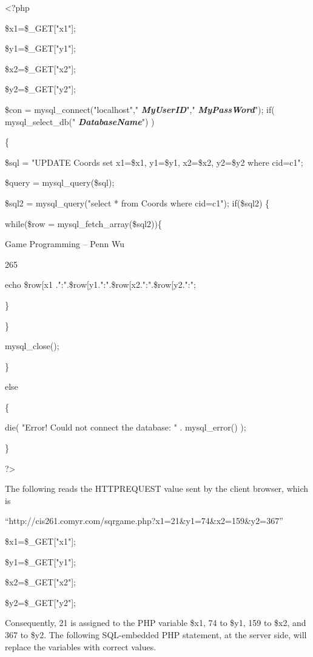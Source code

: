 \documentclass[
]{article}
\begin{document}
\textless?php

\$x1=\$\_GET{[}"x1"{]};

\$y1=\$\_GET{[}"y1"{]};

\$x2=\$\_GET{[}"x2"{]};

\$y2=\$\_GET{[}"y2"{]};

\$con = mysql\_connect("localhost"," \emph{\textbf{MyUserID}}","
\emph{\textbf{MyPassWord}}"); if( mysql\_select\_db("
\emph{\textbf{DatabaseName}}") )

\{

\$sql = "UPDATE Coords set x1=\textquotesingle\$x1\textquotesingle,
y1=\textquotesingle\$y1\textquotesingle,
x2=\textquotesingle\$x2\textquotesingle,
y2=\textquotesingle\$y2\textquotesingle{} where
cid=\textquotesingle c1\textquotesingle";

\$query = mysql\_query(\$sql);

\$sql2 = mysql\_query("select * from Coords where
cid=\textquotesingle c1\textquotesingle"); if(\$sql2) \{

while(\$row = mysql\_fetch\_array(\$sql2))\{

Game Programming -- Penn Wu

265

\protect\hypertarget{index_split_014.htmlux5cux23p266}{}{} echo
\$row{[}\textquotesingle x1\textquotesingle{]}
.":".\$row{[}\textquotesingle y1\textquotesingle{]}.":".\$row{[}\textquotesingle x2\textquotesingle{]}.":".\$row{[}\textquotesingle y2\textquotesingle{]}.":";

\}

\}

mysql\_close();

\}

else

\{

die( "Error! Could not connect the database: " . mysql\_error() );

\}

?\textgreater{}

The following reads the HTTPREQUEST value sent by the client browser,
which is

``http://cis261.comyr.com/sqrgame.php?x1=21\&y1=74\&x2=159\&y2=367''

\$x1=\$\_GET{[}"x1"{]};

\$y1=\$\_GET{[}"y1"{]};

\$x2=\$\_GET{[}"x2"{]};

\$y2=\$\_GET{[}"y2"{]};

Consequently, 21 is assigned to the PHP variable \$x1, 74 to \$y1, 159
to \$x2, and 367 to \$y2. The following SQL-embedded PHP statement, at
the server side, will replace the variables with correct values.
\end{document}
